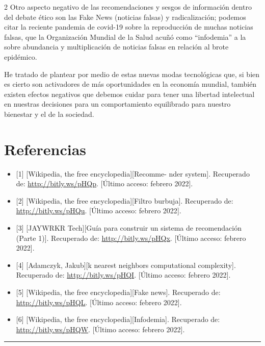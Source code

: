 \documentclass[12pt,spanish,Letterpaper,openany]{book}
\newcommand{\HRule}{\begin{center}\rule{0.5\linewidth}{0.2mm}\end{center}}
\begin{document}
\begin {multicols}{2}
Otro aspecto negativo de las recomendaciones y sesgos de información dentro del debate ético son las Fake News (noticias falsas) y radicalización; podemos citar la reciente pandemia de covid-19 sobre la reproducción de muchas noticias falsas, que la Organización Mundial de la Salud acuñó como ``infodemia'' a la sobre abundancia y multiplicación de noticias falsas en relación al brote epidémico.

He tratado de plantear por medio de estas nuevas modas tecnológicas que, si bien es cierto son activadores de más oportunidades en la economía mundial, también existen efectos negativos que debemos cuidar para tener una libertad intelectual en nuestras decisiones para un comportamiento equilibrado para nuestro bienestar y el de la sociedad.

\hypertarget{referencias-3}{%
\section*{Referencias}\label{referencias-3}}

\begin{itemize}
\item
  {[}1{]} {[}Wikipedia, the free encyclopedia{]}{[}Recomme-
  nder system{]}. Recuperado de: \url{http://bitly.ws/pHQp}. {[}Último acceso: febrero 2022{]}.
\item
  {[}2{]} {[}Wikipedia, the free encyclopedia{]}{[}Filtro burbuja{]}. Recuperado de: \url{http://bitly.ws/pHQu}. {[}Último acceso: febrero 2022{]}.
\item
  {[}3{]} {[}JAYWRKR Tech{]}{[}Guía para construir un sistema de recomendación (Parte 1){]}. Recuperado de: \url{http://bitly.ws/pHQx}. {[}Último acceso: febrero 2022{]}.
\item
  {[}4{]} {[}Adamczyk, Jakub{]}{[}k nearest neighbors computational complexity{]}. Recuperado de: \url{http://bitly.ws/pHQI}. {[}Último acceso: febrero 2022{]}.
\item
  {[}5{]} {[}Wikipedia, the free encyclopedia{]}{[}Fake news{]}. Recuperado de: \url{http://bitly.ws/pHQL}. {[}Último acceso: febrero 2022{]}.
\item
  {[}6{]} {[}Wikipedia, the free encyclopedia{]}{[}Infodemia{]}. Recuperado de: \url{http://bitly.ws/pHQW}. {[}Último acceso: febrero 2022{]}.
\end{itemize}

\end {multicols}
\medskip
\HRule
\medskip
\end{document}
